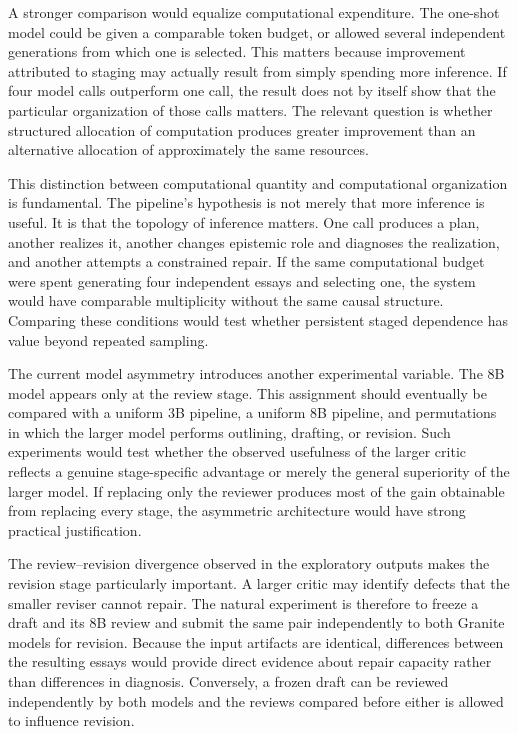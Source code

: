 \documentclass[11pt]{article}
\begin{document}
A stronger comparison would equalize computational expenditure. The one-shot model could be given a comparable token budget, or allowed several independent generations from which one is selected. This matters because improvement attributed to staging may actually result from simply spending more inference. If four model calls outperform one call, the result does not by itself show that the particular organization of those calls matters. The relevant question is whether structured allocation of computation produces greater improvement than an alternative allocation of approximately the same resources.

This distinction between computational quantity and computational organization is fundamental. The pipeline's hypothesis is not merely that more inference is useful. It is that the topology of inference matters. One call produces a plan, another realizes it, another changes epistemic role and diagnoses the realization, and another attempts a constrained repair. If the same computational budget were spent generating four independent essays and selecting one, the system would have comparable multiplicity without the same causal structure. Comparing these conditions would test whether persistent staged dependence has value beyond repeated sampling.

The current model asymmetry introduces another experimental variable. The 8B model appears only at the review stage. This assignment should eventually be compared with a uniform 3B pipeline, a uniform 8B pipeline, and permutations in which the larger model performs outlining, drafting, or revision. Such experiments would test whether the observed usefulness of the larger critic reflects a genuine stage-specific advantage or merely the general superiority of the larger model. If replacing only the reviewer produces most of the gain obtainable from replacing every stage, the asymmetric architecture would have strong practical justification.

The review--revision divergence observed in the exploratory outputs makes the revision stage particularly important. A larger critic may identify defects that the smaller reviser cannot repair. The natural experiment is therefore to freeze a draft and its 8B review and submit the same pair independently to both Granite models for revision. Because the input artifacts are identical, differences between the resulting essays would provide direct evidence about repair capacity rather than differences in diagnosis. Conversely, a frozen draft can be reviewed independently by both models and the reviews compared before either is allowed to influence revision.
\end{document}
